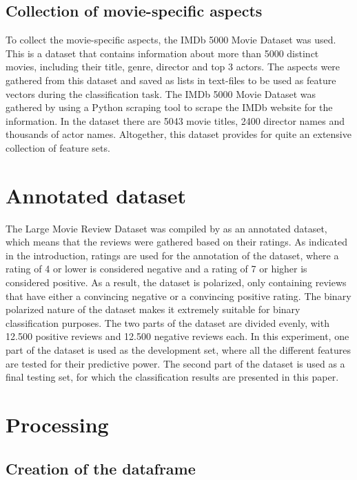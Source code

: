\documentclass[
10pt, %
a4paper, %
oneside, %
headinclude,footinclude, %
] {book}%
\begin{document}
\newpage

\subsection{Collection of movie-specific aspects}

To collect the movie-specific aspects, the IMDb 5000 Movie Dataset was used. This is a dataset that contains information about more than 5000 distinct movies, including their title, genre, director and top 3 actors. The aspects were gathered from this dataset and saved as lists in text-files to be used as feature vectors during the classification task. The IMDb 5000 Movie Dataset was gathered by using a Python scraping tool to scrape the IMDb website for the information. In the dataset there are 5043 movie titles, 2400 director names and thousands of actor names. Altogether, this dataset provides for quite an extensive collection of feature sets.

\section{Annotated dataset}

The Large Movie Review Dataset was compiled by \citet{maas2011learning} as an annotated dataset, which means that the reviews were gathered based on their ratings. As indicated in the introduction, ratings are used for the annotation of the dataset, where a rating of 4 or lower is considered negative and a rating of 7 or higher is considered positive. As a result, the dataset is polarized, only containing reviews that have either a convincing negative or a convincing positive rating. The binary polarized nature of the dataset makes it extremely suitable for binary classification purposes. The two parts of the dataset are divided evenly, with 12.500 positive reviews and 12.500 negative reviews each. In this experiment, one part of the dataset is used as the development set, where all the different features are tested for their predictive power. The second part of the dataset is used as a final testing set, for which the classification results are presented in this paper.

\section{Processing}

\subsection{Creation of the dataframe}
\end{document}
